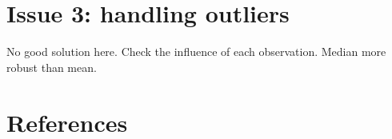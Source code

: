 \documentclass[12pt]{article}
\begin{document}
\clearpage

\section{Issue 3: handling outliers}
\label{sec:org8cb9ab4}

No good solution here.
Check the influence of each observation. Median more robust than mean.



\section{References}
\label{sec:org0cd96a4}
\begingroup
\renewcommand{\section}[2]{}



\endgroup
\end{document}
